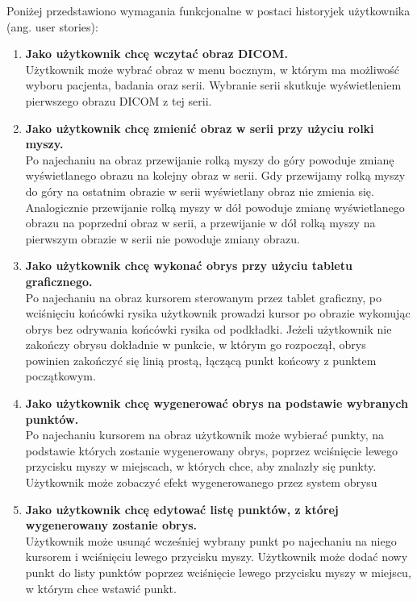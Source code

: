 \documentclass[a4paper,11pt,twoside]{report}
\theoremstyle{definition}
\begin{document}
Poniżej przedstawiono wymagania funkcjonalne w postaci historyjek użytkownika (ang. user stories): 
\begin{enumerate}
\item \textbf {Jako użytkownik chcę wczytać obraz DICOM.} \\
Użytkownik może wybrać obraz w menu bocznym, w którym ma możliwość wyboru pacjenta, badania oraz serii. Wybranie serii skutkuje wyświetleniem pierwszego obrazu DICOM z tej serii.

\item \textbf {Jako użytkownik chcę zmienić obraz w serii przy użyciu rolki myszy.} \\
Po najechaniu na obraz przewijanie rolką myszy do góry powoduje zmianę wyświetlanego obrazu na kolejny obraz w serii. Gdy przewijamy rolką myszy do góry na ostatnim obrazie w serii wyświetlany obraz nie zmienia się. Analogicznie przewijanie rolką myszy w dół powoduje zmianę wyświetlanego obrazu na poprzedni obraz w serii, a przewijanie w dół rolką myszy na pierwszym obrazie w serii nie powoduje zmiany obrazu.

\item \textbf {Jako użytkownik chcę wykonać obrys przy użyciu tabletu graficznego.} \\
Po najechaniu na obraz kursorem sterowanym przez tablet graficzny, po wciśnięciu końcówki rysika użytkownik prowadzi kursor po obrazie wykonując obrys bez odrywania końcówki rysika od podkładki. Jeżeli użytkownik nie zakończy obrysu dokładnie w punkcie, w którym go rozpoczął, obrys powinien zakończyć się linią prostą, łączącą punkt końcowy z punktem początkowym.

\item \textbf {Jako użytkownik chcę wygenerować obrys na podstawie wybranych punktów.} \\
Po najechaniu kursorem na obraz użytkownik może wybierać punkty, na podstawie których zostanie wygenerowany obrys, poprzez wciśnięcie lewego przycisku myszy w miejscach, w których chce, aby znalazły się punkty. Użytkownik może zobaczyć efekt wygenerowanego przez system obrysu

\item \textbf {Jako użytkownik chcę edytować listę punktów, z której wygenerowany zostanie obrys.} \\
Użytkownik może usunąć wcześniej wybrany punkt po najechaniu na niego kursorem i wciśnięciu lewego przycisku myszy. Użytkownik może dodać nowy punkt do listy punktów poprzez wciśnięcie lewego przycisku myszy w miejscu, w którym chce wstawić punkt.


\end{enumerate}
\end{document}
